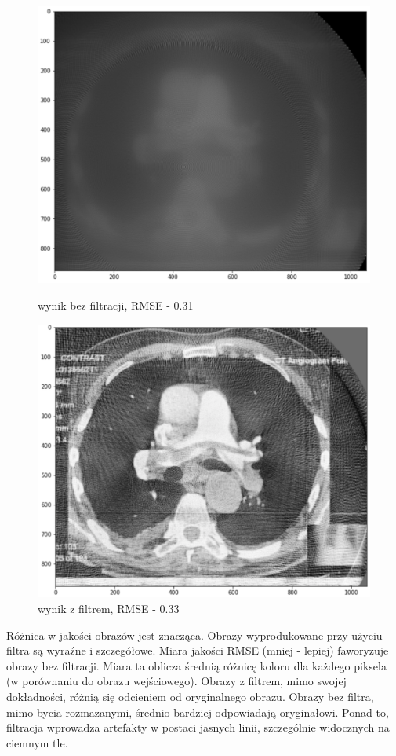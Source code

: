 \documentclass[polish,polish,a4paper]{article}
\begin{document}
			\begin{figure}[!h]
				\centering
				\begin{minipage}{0.45\linewidth}
					\includegraphics[width=\linewidth]{img/saddle_nf.png}
					\caption{wynik bez filtracji, RMSE - 0.31}
				\end{minipage}
				\hfill
				\begin{minipage}{0.45\linewidth}
					\includegraphics[width=\linewidth]{img/saddle_f.png}
					\caption{wynik z filtrem, RMSE - 0.33}
				\end{minipage}
			\end{figure}
			Różnica w jakości obrazów jest znacząca. 
			Obrazy wyprodukowane przy użyciu filtra są wyraźne i szczegółowe. 
			Miara jakości RMSE (mniej - lepiej) faworyzuje obrazy bez filtracji. 
			Miara ta oblicza średnią różnicę koloru dla każdego piksela (w porównaniu do obrazu wejściowego). 
			Obrazy z filtrem, mimo swojej dokładności, 
			różnią się odcieniem od oryginalnego obrazu. 
			Obrazy bez filtra, mimo bycia rozmazanymi, 
			średnio bardziej odpowiadają oryginałowi. 
			Ponad to, filtracja wprowadza artefakty w postaci jasnych linii, 
			szczególnie widocznych na ciemnym tle.
\end{document}
